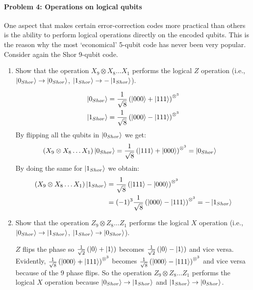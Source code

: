 \documentclass[12pt]{article}
\newcommand{\rsqrt}[1]{\ensuremath{\frac{1}{\sqrt{#1}}}}
\newenvironment{answer}{\begingroup\setlength{\leftskip}{-\leftmargin}\begin{framed}}{\end{framed}\endgroup}
\begin{document}
\paragraph{Problem 4: Operations on logical qubits}

One aspect that makes certain error-correction codes more practical than others is the ability to perform logical operations directly on the encoded qubits. This is the reason why the most `economical' 5-qubit code has never been very popular. Consider again the Shor 9-qubit code.

\begin{enumerate}

    \item Show that the operation $X_9 \otimes X_8 \dots X_1$ performs the logical $Z$ operation (i.e., $\ket{0_{Shor}} \rightarrow \ket{0_{Shor}}$, $\ket{1_{Shor}} \rightarrow -\ket{1_{Shor}}$).

    \begin{answer}
        \begin{align*}
            \ket{0_{Shor}} &= \rsqrt{8}\left(\ket{000} + \ket{111}\right)^{\otimes^3} \\
            \ket{1_{Shor}} &= \rsqrt{8}\left(\ket{000} - \ket{111}\right)^{\otimes^3}
        \end{align*}
        By flipping all the qubits in $\ket{0_{Shor}}$ we get:
        \begin{align*}
            \left(X_9 \otimes X_8 \dots X_1\right)\ket{0_{Shor}} &= \rsqrt{8}\left(\ket{111} + \ket{000}\right)^{\otimes^3} = \ket{0_{Shor}}
        \end{align*}
        By doing the same for $\ket{1_{Shor}}$ we obtain:
        \begin{align*}
            \left(X_9 \otimes X_8 \dots X_1\right)\ket{1_{Shor}} &= \rsqrt{8}\left(\ket{111} - \ket{000}\right)^{\otimes^3}\\
            &= (-1)^3\rsqrt{8}\left(\ket{000} - \ket{111}\right)^{\otimes^3} = -\ket{1_{Shor}}
        \end{align*}
    \end{answer}

    \item Show that the operation $Z_9 \otimes Z_8 \dots Z_1$ performs the logical $X$ operation (i.e., $\ket{0_{Shor}} \rightarrow \ket{1_{Shor}}$, $\ket{1_{Shor}} \rightarrow \ket{0_{Shor}}$).

    \begin{answer}
        $Z$ flips the phase so $\rsqrt{2}\left(\ket{0} + \ket{1}\right)$ becomes $\rsqrt{2}\left(\ket{0} - \ket{1}\right)$ and vice versa. Evidently, $\rsqrt{8}\left(\ket{000} + \ket{111}\right)^{\otimes^3}$ becomes $\rsqrt{8}\left(\ket{000} - \ket{111}\right)^{\otimes^3}$ and vice versa because of the 9 phase flips. So the operation $Z_9 \otimes Z_8 \dots Z_1$ performs the logical $X$ operation because $\ket{0_{Shor}} \rightarrow \ket{1_{Shor}}$ and $\ket{1_{Shor}} \rightarrow \ket{0_{Shor}}$.
    \end{answer}


\end{enumerate}
\end{document}

